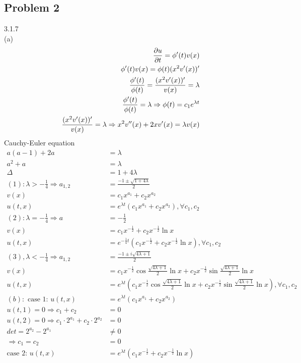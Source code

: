 \subsection*{Problem 2}
3.1.7
\\(a)\begin{align*}{}{}
\pdv{u}{t}=\phi'(t)v(x)\\
\phi'(t)v(x)=\phi(t)(x^2v'(x))'\\
\frac{\phi'(t)}{\phi(t)}=\frac{(x^2v'(x))'}{v(x)}=\lambda\\
\frac{\phi'(t)}{\phi(t)}=\lambda \Rightarrow \phi(t)=c_1e^{\lambda t}\\
\frac{(x^2v'(x))'}{v(x)}=\lambda \Rightarrow x^2v''(x)+2xv'(x)=\lambda v(x)\\
\end{align*}
Cauchy-Euler equation
\begin{align*}{}{}
a(a-1)+2a&=\lambda\\
a^2+a&=\lambda\\
\Delta&=1+4\lambda\\
(1): \lambda>-\frac{1}{4} \Rightarrow a_{1,2}&=\frac{-1\pm\sqrt{1+4\lambda}}{2}\\
v(x)&=c_1x^{a_1}+c_2x^{a_2}\\
u(t,x)&=e^{\lambda t}(c_1x^{a_1}+c_2x^{a_2}),\forall c_1,c_2\\
(2):\lambda=-\frac{1}{4} \Rightarrow a&=-\frac{1}{2}\\
v(x)&=c_1x^{-\frac{1}{2}}+c_2x^{-\frac{1}{2}}\ln{x}\\
u(t,x)&=e^{-\frac{1}{4}t}(c_1x^{-\frac{1}{2}}+c_2x^{-\frac{1}{2}}\ln{x}),\forall c_1,c_2\\
(3),\lambda<-\frac{1}{4} \Rightarrow a_{1,2}&=\frac{-1\pm i\sqrt{4\lambda+1}}{2}\\
v(x)&=c_1x^{-\frac{1}{2}}\cos{\frac{\sqrt{4\lambda+1}}{2}\ln{x}}+c_2x^{-\frac{1}{2}}\sin\frac{{\sqrt{4\lambda+1}}}{2}\ln{x}\\
u(t,x)&=e^{\lambda t}(c_1x^{-\frac{1}{2}}\cos\frac{{\sqrt{4\lambda+1}}}{2}\ln{x}+c_2x^{-\frac{1}{2}}\sin{\frac{\sqrt{4\lambda+1}}{2}\ln{x}}),\forall c_1,c_2\\
(b): \text{ case 1: }u(t,x)&=e^{\lambda t}(c_1x^{a_1}+c_2x^{a_2})\\
u(t,1)=0 \Rightarrow c_1+c_2&=0\\
u(t,2)=0 \Rightarrow c_1\cdot2^{a_1}+c_2\cdot2^{a_2}&=0\\
det=2^{a_2}-2^{a_1}&\neq 0\\ 
\Rightarrow c_1=c_2&=0 \\
\text{case 2: }u(t,x)&=e^{\lambda t}(c_1x^{-\frac{1}{2}}+c_2x^{-\frac{1}{2}}\ln{x})\\

\end{align*}
